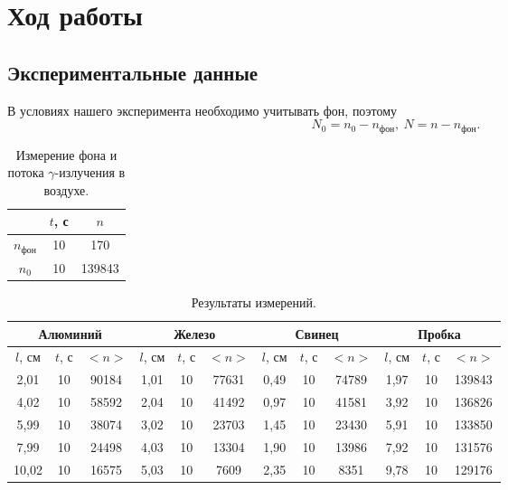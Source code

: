 \documentclass[a4paper, 12pt]{article}%
\begin{document}
\section{Ход работы}	
	
	\subsection{Экспериментальные данные}
		В условиях нашего эксперимента необходимо учитывать фон, поэтому
		\begin{equation*}
			N_0 = n_0 - n_\text{фон}, \ N = n - n_\text{фон}.
		\end{equation*}
		
		
		\begin{table}[!h]
		\begin{center}
			\caption{Измерение фона и потока $\gamma$-излучения в воздухе.}
			\label{table:exp1}
			\begin{tabular}{|c|c|c|}
				\hline
				& $t$, с & $n$    \\ \hline
				$n_{\text{фон}}$ & 10    & 170   \\ \hline
				$n_0$            & 10     & 139843 \\ \hline
			\end{tabular}
		\end{center}
		\end{table}
		
		
	

		\begin{table}[!h]
		\begin{center}
			\caption{Результаты измерений.}
			\label{table:exp2}
			\begin{tabular}{|c|c|c|c|c|c|c|c|c|c|c|c|}
				\hline
				\multicolumn{3}{|c|}{Алюминий} & \multicolumn{3}{c|}{Железо} & \multicolumn{3}{c|}{Свинец} & \multicolumn{3}{c|}{Пробка} \\ \hline
				$l$, см   & $t$, с   & $<n>$     & $l$, см  & $t$, с  & $<n>$    & $l$, см  & $t$, с  & $<n>$    & $l$, см     & $t$, с    & $<n>$       \\ \hline
2,01      & 10      & 90184  & 1,01     & 10     & 77631 & 0,49     & 10     & 74789 & 1,97        & 10        & 139843    \\ \hline
4,02      & 10      & 58592  & 2,04     & 10     & 41492 & 0,97     & 10     & 41581 & 3,92        & 10        & 136826    \\ \hline
5,99      & 10      &  38074& 3,02     & 10     & 23703 & 1,45     & 10     & 23430 & 5,91        & 10        & 133850    \\ \hline
7,99      & 10      & 24498 & 4,03     & 10     & 13304 & 1,90     & 10     & 13986 & 7,92        & 10        & 131576    \\ \hline
10,02     & 10      & 16575  & 5,03     & 10     & 7609  & 2,35     & 10     & 8351  & 9,78        & 10        & 129176    \\ \hline
			\end{tabular}
		\end{center}
		\end{table}
		
\end{document}
